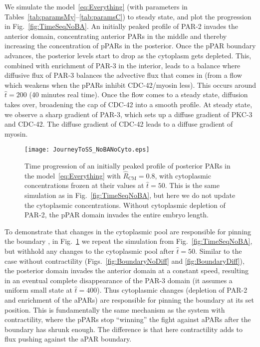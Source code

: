 \documentclass[11pt]{article}
\newcommand{\6}[1]{#1_{\text{6}}}
\newcommand{\3}[1]{#1_{\text{3}}}
\begin{document}
We simulate the model\ \eqref{eq:Everything} (with parameters in Tables\ \ref{tab:paramsMy}--\ref{tab:paramsC}) to steady state, and plot the progression in Fig.\ \ref{fig:TimeSeqNoBA}. An initially peaked profile of PAR-2 invades the anterior domain, concentrating anterior PARs in the middle and thereby increasing the concentration of pPARs in the posterior. Once the pPAR boundary advances, the posterior levels start to drop as the cytoplasm gets depleted. This, combined with enrichment of PAR-3 in the interior, leads to a balance where diffusive flux of PAR-3 balances the advective flux that comes in (from a flow which weakens when the pPARs inhibit CDC-42/myosin less). This occurs around $\hat t = 200$ (40 minutes real time). Once the flow comes to a steady state, diffusion takes over, broadening the cap of CDC-42 into a smooth profile. At steady state, we observe a sharp gradient of PAR-3, which sets up a diffuse gradient of PKC-3 and CDC-42. The diffuse gradient of CDC-42 leads to a diffuse gradient of myosin.

\begin{figure}
\centering
\texttt{[image: JourneyToSS\_NoBANoCyto.eps]}
\caption{\label{fig:TimeSeqNoCyto} Time progression of an initially peaked profile of posterior PARs in the model\ \eqref{eq:Everything} with $\hat R_\text{CM}=0.8$, with cytoplasmic concentrations frozen at their values at $\hat t=50$. This is the same simulation as in Fig.\ \ref{fig:TimeSeqNoBA}, but here we do not update the cytoplasmic concentrations. Without cytoplasmic depletion of PAR-2, the pPAR domain invades the entire embryo length.}
\end{figure}

To demonstrate that changes in the cytoplasmic pool are responsible for pinning the boundary \cite{goehring2011polarization}, in Fig.\ \ref{fig:TimeSeqNoCyto} we repeat the simulation from Fig.\ \ref{fig:TimeSeqNoBA}, but withhold any changes to the cytoplasmic pool after $\hat t = 50$. Similar to the case without contractility (Figs.\ \ref{fig:BoundaryNoDiff} and \ref{fig:BoundaryDiff}), the posterior domain invades the anterior domain at a constant speed, resulting in an eventual complete disappearance of the PAR-3 domain (it assumes a uniform small state at $\hat t = 400$). Thus cytoplasmic changes (depletion of PAR-2 and enrichment of the aPARs) are responsible for pinning the boundary at its set position. This is fundamentally the same mechanism as the system with contractility, where the pPARs stop ``winning'' the fight against aPARs after the boundary has shrunk enough. The difference is that here contractility adds to flux pushing against the aPAR boundary. 
\end{document}
